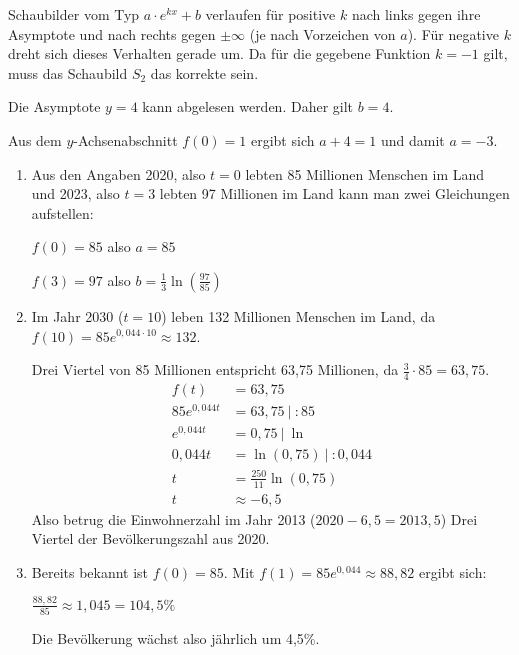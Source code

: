 \begin{Answer}[ref=eFktVA_2]

    Schaubilder vom Typ \(a\cdot e^{kx}+b\) verlaufen für positive \(k\) nach links gegen ihre Asymptote und nach rechts gegen \(\pm\infty\) (je nach Vorzeichen von \(a\)). Für negative \(k\) dreht sich dieses Verhalten gerade um. Da für die gegebene Funktion \(k=-1\) gilt, muss das Schaubild \(S_2\) das korrekte sein.

    Die Asymptote \(y=4\) kann abgelesen werden. Daher gilt \(b=4\).

    Aus dem \(y\)-Achsenabschnitt \(f(0)=1\) ergibt sich \(a+4=1\) und damit \(a=-3\).
\end{Answer}
\begin{Answer}[ref=eFktVA_3]
    \begin{enumerate}[label=\alph*)]
        \item Aus den Angaben 2020, also \(t=0\) lebten 85 Millionen Menschen im Land und 2023, also \(t=3\) lebten 97 Millionen im Land kann man zwei Gleichungen aufstellen:

        \(f(0)=85\) also \(a=85\)

        \(f(3)=97\) also \(b=\frac{1}{3}\ln\left(\frac{97}{85}\right)\)
        \item Im Jahr 2030 (\(t=10\)) leben 132 Millionen Menschen im Land, da \(f(10)=85e^{0,044\cdot10}\approx 132\).

        Drei Viertel von 85 Millionen entspricht 63,75 Millionen, da \(\frac{3}{4}\cdot 85=63,75\).
        \begin{align*}
            f(t)&=63,75\\
            85e^{0,044t}&=63,75\ \vert\ :85\\
            e^{0,044t}&=0,75\ \vert\ \ln\\
            0,044t&=\ln(0,75)\ \vert\ :0,044\\
            t&=\frac{250}{11}\ln(0,75)\\
            t&\approx-6,5
        \end{align*}
        Also betrug die Einwohnerzahl im Jahr 2013 (\(2020-6,5=2013,5\)) Drei Viertel der Bevölkerungszahl aus 2020.
        \item Bereits bekannt ist \(f(0)=85\). Mit \(f(1)=85e^{0,044}\approx88,82\) ergibt sich:

        \(\frac{88,82}{85}\approx1,045=104,5\%\)

        Die Bevölkerung wächst also jährlich um 4,5\%.
    \end{enumerate}
\end{Answer}
